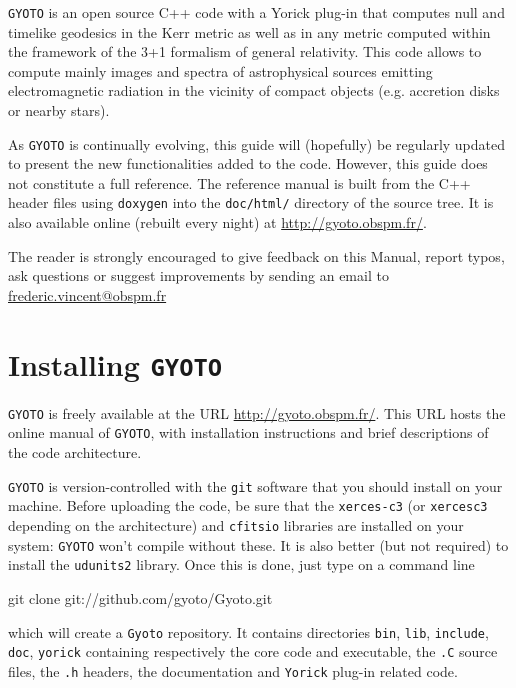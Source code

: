 \documentclass[a4paper,12pt]{article}
\begin{document}
\texttt{GYOTO} is an open source C++ code with a Yorick plug-in that computes null and timelike geodesics in the Kerr metric as well as in any metric computed within the framework of the 3+1 formalism of general relativity. This code allows to compute mainly images and spectra of astrophysical sources emitting electromagnetic radiation in the vicinity of compact objects (e.g. accretion disks or nearby stars). 

As \texttt{GYOTO} is continually evolving, this guide will (hopefully) be regularly updated to present the new functionalities added to the code. However, this guide does not constitute a full reference. The reference manual is built from the C++ header files using \texttt{doxygen} into the \texttt{doc/html/} directory of the source tree. It is also available online (rebuilt every night) at \url{http://gyoto.obspm.fr/}.

The reader is strongly encouraged to give feedback on this Manual, report typos, ask questions or suggest improvements by sending an email to \url{frederic.vincent@obspm.fr}

\tableofcontents



\newpage

\section{Installing \texttt{GYOTO}}
\label{install}

\texttt{GYOTO} is freely available at the URL \url{http://gyoto.obspm.fr/}. This URL hosts the online manual of \texttt{GYOTO}, with installation instructions and brief descriptions of the code architecture.

\texttt{GYOTO} is version-controlled with the \texttt{git} software that you should install on your machine.
Before uploading the code, be sure that the \texttt{xerces-c3} (or \texttt{xercesc3} depending on the
architecture) and \texttt{cfitsio} libraries are installed on your system: \texttt{GYOTO} won't compile without these.
It is also better (but not required) to install the \texttt{udunits2} library. Once this is done, just type on a command line
\begin{code}
git clone git://github.com/gyoto/Gyoto.git
\end{code}  
which will create a \texttt{Gyoto} repository. It contains directories \texttt{bin}, \texttt{lib}, \texttt{include}, \texttt{doc}, \texttt{yorick}
containing respectively the core code and executable, the \texttt{.C} source files, the \texttt{.h} headers, the documentation
and \texttt{Yorick} plug-in related code. 
\end{document}
